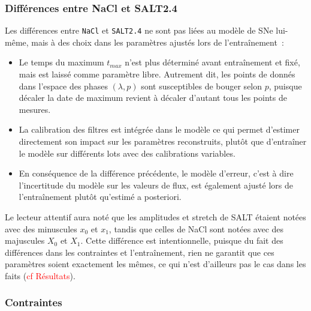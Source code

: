 \documentclass{book}
\def\nacl{\texttt{NaCl}\xspace}
\def\saltd{\texttt{SALT2.4}\xspace}
\begin{document}
\subsubsection{Différences entre NaCl et SALT2.4}

Les différences entre \nacl et \saltd ne sont pas liées au modèle de SNe lui-même, mais à des choix dans les paramètres ajustés lors de l'entraînement~:
\begin{itemize}
\item Le temps du maximum $t_{max}$ n'est plus déterminé avant entraînement et fixé, mais est laissé comme paramètre libre. Autrement dit, les points de donnés dans l'espace des phases $(\lambda, p)$ sont susceptibles de bouger selon $p$, puisque décaler la date de maximum revient à décaler d'autant tous les points de mesures.
\item La calibration des filtres est intégrée dans le modèle ce qui permet d'estimer directement son impact sur les paramètres reconstruits, plutôt que d'entraîner le modèle sur différents lots avec des calibrations variables.
\item En conséquence de la différence précédente, le modèle d'erreur, c'est à dire l'incertitude du modèle sur les valeurs de flux, est également ajusté lors de l'entraînement plutôt qu'estimé a posteriori.
\end{itemize}
Le lecteur attentif aura noté que les amplitudes et stretch de SALT étaient notées avec des minuscules $x_0$ et $x_1$, tandis que celles de NaCl sont notées avec des majuscules $X_0$ et $X_1$. Cette différence est intentionnelle, puisque du fait des différences dans les contraintes et l'entraînement, rien ne garantit que ces paramètres soient exactement les mêmes, ce qui n'est d'ailleurs pas le cas dans les faits (\textcolor{red}{cf Résultats}).

\subsubsection{Contraintes}
\end{document}
